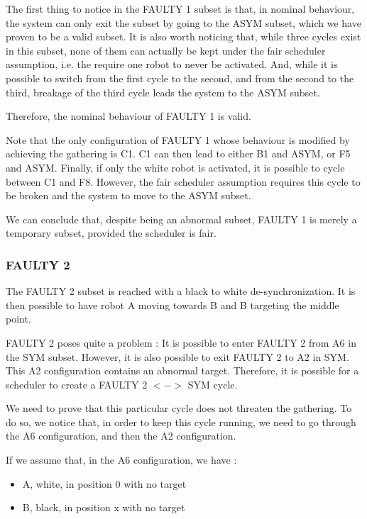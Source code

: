 \documentclass[11pt]{article}
\begin{document}
The first thing to notice in the FAULTY 1 subset is that, in nominal behaviour, the system can only exit the subset by going to the ASYM subset, which we have proven to be a valid subset.
It is also worth noticing that, while three cycles exist in this subset, none of them can actually be kept under the fair scheduler assumption, i.e. the require one robot to never be activated. And, while it is possible to switch from the first cycle to the second, and from the second to the third, breakage of the third cycle leads the system to the ASYM subset.

Therefore, the nominal behaviour of FAULTY 1 is valid.

Note that the only configuration of FAULTY 1 whose behaviour is modified by achieving the gathering is C1. C1 can then lead to either B1 and ASYM, or F5 and ASYM. Finally, if only the white robot is activated, it is possible to cycle between C1 and F8. However, the fair scheduler assumption requires this cycle to be broken and the system to move to the ASYM subset.

We can conclude that, despite being an abnormal subset, FAULTY 1 is merely a temporary subset, provided the scheduler is fair.

\subsubsection{FAULTY 2}
The FAULTY 2 subset is reached with a black to white de-synchronization.
It is then possible to have robot A moving towards B and B targeting the middle point.

FAULTY 2 poses quite a problem : It is possible to enter FAULTY 2 from A6 in the SYM subset. However, it is also possible to exit FAULTY 2 to A2 in SYM. This A2 configuration contains an abnormal target. Therefore, it is possible for a scheduler to create a FAULTY 2 $<->$ SYM cycle.

We need to prove that this particular cycle does not threaten the gathering. To do so, we notice that, in order to keep this cycle running, we need to go through the A6 configuration, and then the A2 configuration.

If we assume that, in the A6 configuration, we have :
\begin{itemize}
\item A, white, in position 0 with no target
\item B, black, in position x with no target

\end{itemize}
\end{document}
